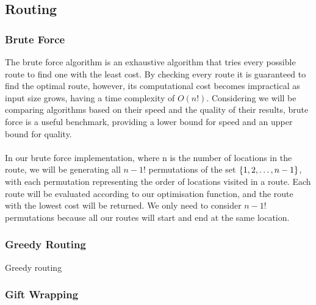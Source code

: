 \noindent
{}

\subsection{Routing}\label{subsec:routing}
\subsubsection{Brute Force}\label{subsubsec:brute-force-routing}
The brute force algorithm is an exhaustive algorithm that tries every possible route to find one with the least cost.
By checking every route it is guaranteed to find the optimal route, however, its computational cost becomes
impractical as input size grows, having a time complexity of $O(n!)$.
Considering we will be comparing algorithms based on their speed and the quality of their results, brute force is a
useful benchmark, providing a lower bound for speed and an upper bound for quality.\\
\\
In our brute force implementation, where n is the number of locations in the route, we will be generating all $n-1!$
permutations of the set $\{1, 2, \mathellipsis, n-1\}$, with each permutation representing the order of locations
visited in a route.
Each route will be evaluated according to our optimisation function, and the route with the lowest cost will be
returned.
We only need to consider $n-1!$ permutations because all our routes will start and end at the same location.\\


\subsubsection{Greedy Routing}\label{subsubsec:greedy-routing}
Greedy routing
\subsubsection{Gift Wrapping}\label{subsubsec:gift-wrapping}
